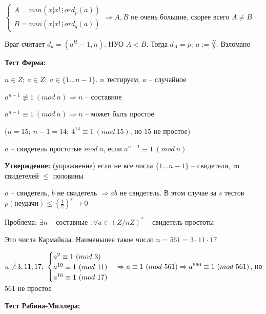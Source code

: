 \documentclass[14pt, letter paper]{article}
\begin{document}
$\begin{cases}
    A = min(x | x! \, \vdots \, ord_p(a)) \\
    B = min(x | x! \, \vdots \, ord_q(a))
\end{cases} \Rightarrow A, B$ не очень большие, скорее всего $A \neq B$

\vspace{1mm}

Враг считает $d_k = (a^{k!} - 1, n)$. НУО $A < B$. Тогда $d_A = p;\ a := \frac{N}{b}$. Взломано

\vspace{5mm}

\textbf{Тест Ферма:}

$n \in Z;\ a \in Z;\ a \in \{1 \ldots n-1\}$. $n$ тестируем, $a$ -- случайное

$a^{n-1} \not\equiv 1\ (mod\ n) \Rightarrow n$ -- составное

$a^{n-1} \equiv 1\ (mod\ n) \Rightarrow n$ -- может быть простое

\vspace{2mm}

($n = 15;\ n-1 = 14;\ 4^{14} \equiv 1\ (mod\ 15)$, но $15$ не простое)

\vspace{2mm}

$a$ -- свидетель простотые $mod\ n$, если $a^{n-1} \equiv 1\ (mod\ n)$

\textbf{Утверждение:} (упражнение) если не все числа $\{1 \ldots n-1\}$ -- свидетели, то свидетелей $\leq$ половины

$a$ -- свидетель, $b$ не свидетель $\Rightarrow ab$ не свидетель. В этом случае за $s$ тестов $p(\text{неудачи}) \leq (\frac{1}{2})^s \rightarrow 0$

Проблема: $\exists n$ -- составные $: \forall a \in (Z/nZ)^*$ -- свидетель простоты

Это числа Кармайкла. Наименьшее такое число $n = 561 = 3 \cdot 11 \cdot 17$

$a \not\, \vdots \, 3, 11, 17;\ \begin{cases}
    a^2 \equiv 1\ (mod\ 3) \\
    a^{10} \equiv 1\ (mod\ 11) \\
    a^{16} \equiv 1\ (mod\ 17)
\end{cases} \Rightarrow a \equiv 1\ (mod\ 561) \Rightarrow a^{560} \equiv 1\ (mod\ 561)$, но 561 не простое

\vspace{5mm}

\textbf{Тест Рабина-Миллера:}
\end{document}
